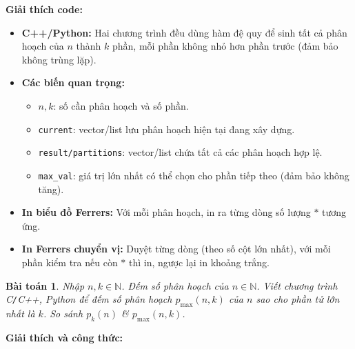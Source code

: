 \documentclass{article}
\newtheorem{baitoan}{Bài toán}
\begin{document}
\textbf{Giải thích code:}

\begin{itemize}
    \item \textbf{C++/Python:} Hai chương trình đều dùng hàm đệ quy để sinh tất cả phân hoạch của $n$ thành $k$ phần, mỗi phần không nhỏ hơn phần trước (đảm bảo không trùng lặp).
    \item \textbf{Các biến quan trọng:}
    \begin{itemize}
        \item $n, k$: số cần phân hoạch và số phần.
        \item \texttt{current}: vector/list lưu phân hoạch hiện tại đang xây dựng.
        \item \texttt{result/partitions}: vector/list chứa tất cả các phân hoạch hợp lệ.
        \item \texttt{max\_val}: giá trị lớn nhất có thể chọn cho phần tiếp theo (đảm bảo không tăng).
    \end{itemize}
    \item \textbf{In biểu đồ Ferrers:} Với mỗi phân hoạch, in ra từng dòng số lượng $*$ tương ứng.
    \item \textbf{In Ferrers chuyển vị:} Duyệt từng dòng (theo số cột lớn nhất), với mỗi phần kiểm tra nếu còn $*$ thì in, ngược lại in khoảng trắng.
\end{itemize}

\begin{baitoan}
    Nhập $n,k\in\mathbb{N}$. Đếm số phân hoạch của $n\in\mathbb{N}$. Viết chương trình {\sf C{\tt/}C++, Python} để đếm số phân hoạch $p_{\max}(n,k)$ của $n$ sao cho phần tử lớn nhất là $k$. So sánh $p_k(n)$ \& $p_{\max}(n,k)$.
\end{baitoan}


\textbf{Giải thích và công thức:}
\end{document}

